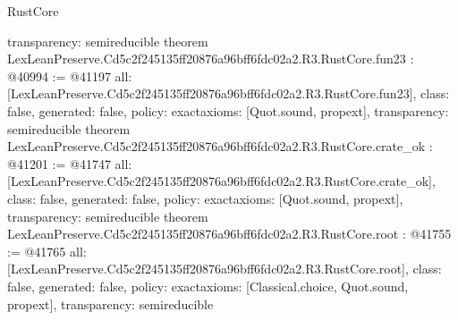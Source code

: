 \begin{lexlean}{RustCore}
\begin{coremodule}
{  transparency: semireducible
}
theorem LexLeanPreserve.Cd5c2f245135ff20876a96bff6fdc02a2.R3.RustCore.fun23 : @40994 := @41197 {
  all: [LexLeanPreserve.Cd5c2f245135ff20876a96bff6fdc02a2.R3.RustCore.fun23],
  class: false,
  generated: false,
  policy: exact{axioms: [Quot.sound, propext]},
  transparency: semireducible
}
theorem LexLeanPreserve.Cd5c2f245135ff20876a96bff6fdc02a2.R3.RustCore.crate_ok : @41201 := @41747 {
  all: [LexLeanPreserve.Cd5c2f245135ff20876a96bff6fdc02a2.R3.RustCore.crate_ok],
  class: false,
  generated: false,
  policy: exact{axioms: [Quot.sound, propext]},
  transparency: semireducible
}
theorem LexLeanPreserve.Cd5c2f245135ff20876a96bff6fdc02a2.R3.RustCore.root : @41755 := @41765 {
  all: [LexLeanPreserve.Cd5c2f245135ff20876a96bff6fdc02a2.R3.RustCore.root],
  class: false,
  generated: false,
  policy: exact{axioms: [Classical.choice, Quot.sound, propext]},
  transparency: semireducible
}


\end{coremodule}
\end{lexlean}
